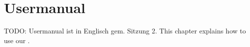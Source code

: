 \chapter{Usermanual}
\label{chap:Usermanual}
TODO: Usermanual ist in Englisch gem. Sitzung 2.
This chapter explains how to use our \tool. 
